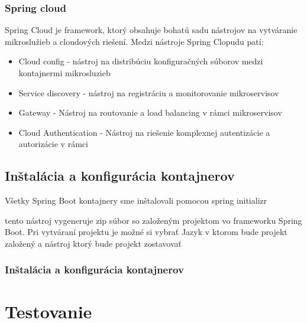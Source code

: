   

  

  

\subsubsection{Spring cloud} 

 Spring Cloud je framework, ktorý obsahuje bohatú sadu nástrojov na vytváranie mikroslužieb a cloudových riešení. Medzi nástroje Spring Clopudu patí:  

\begin{itemize} 

\item Cloud config - nástroj na distribúciu konfiguračných súborov medzi kontajnermi mikrosluzieb

\item Service discovery - nástroj na registráciu a monitorovanie mikroservisov 

\item Gateway - Nástroj na routovanie a load balancing v rámci mikroservisov 

\item Cloud Authentication - Nástroj na riešenie komplexnej autentizácie a autorizácie v rámci 

\end{itemize} 

  

  

  

\subsection{Inštalácia a konfigurácia kontajnerov} 

 Všetky Spring Boot kontajnery sme inštalovali pomocou spring initializr \cite{initializr}

tento nástroj vygeneruje zip súbor so založeným projektom vo frameworku Spring Boot. Pri vytváraní projektu je možné si vybrať Jazyk v ktorom bude projekt založený a nástroj ktorý bude projekt zostavovať %

\subsubsection{Inštalácia a konfigurácia kontajnerov} 

  

 

  

\section{Testovanie} 

